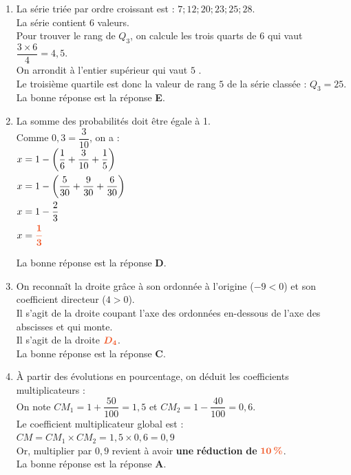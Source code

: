 \documentclass[a4paper,11pt]{article}
\begin{document}
\newpage
\begin{seance}{} %

\begin{enumerate}
\item La série triée par ordre croissant est : $7  ;  12  ;  20  ;  23  ;  25  ;  28$.\\La série contient $6$ valeurs.\\
      Pour trouver le rang de $Q_3$, on calcule les trois quarts de $6$ qui vaut
       $\dfrac{3\times6}{4}=4{,}5$.\\On arrondit à l'entier supérieur qui vaut $5$ .\\ Le troisième quartile est donc la valeur de rang $5$ de la série classée : $Q_3=25$.\\La bonne réponse est la réponse {\bfseries \color[HTML]{F15929}E}.

\item La somme des probabilités doit être égale à 1.  \\Comme $0{,}3=\dfrac{3}{10}$, on a : \\
        $\begin{aligned}
        x&=1-\left(\dfrac{1}{6}+\dfrac{3}{10}+\dfrac{1}{5}\right)\\
        x&=1-\left(\dfrac{5}{30}+\dfrac{9}{30}+\dfrac{6}{30}\right)\\
        x&=1-\dfrac{2}{3}\\
        x&={\color[HTML]{F15929}\boldsymbol{\dfrac{1}{3}}}
        \end{aligned}$ 

\medskip
La bonne réponse est la réponse {\bfseries \color[HTML]{F15929}D}.

\item On reconnaît la droite grâce à son ordonnée à l'origine ($-9<0$) et son coefficient directeur ($4>0$).\\
    Il s'agit de la droite coupant l'axe des ordonnées en-dessous de l'axe des abscisses et qui monte.\\
    Il s'agit de la droite ${\color[HTML]{F15929}\boldsymbol{D_4}}$.\\La bonne réponse est la réponse {\bfseries \color[HTML]{F15929}C}.

\item À partir des évolutions en pourcentage, on déduit les coefficients multiplicateurs : \\On note $CM_1 = 1 + \dfrac{50}{100}=1{,}5$ et  $CM_2 = 1 - \dfrac{40}{100}=0{,}6$.\\ Le coefficient multiplicateur global est : \\ $CM = CM_1 \times CM_2 = 1{,}5 \times 0{,}6 = 0{,}9$ \\Or, multiplier par $0{,}9$ revient à avoir {\bfseries \color[HTML]{F15929}une} {\bfseries \color[HTML]{F15929}réduction} {\bfseries \color[HTML]{F15929}de} ${\color[HTML]{F15929}\boldsymbol{10\,\%}}$.\\La bonne réponse est la réponse {\bfseries \color[HTML]{F15929}A}.


\end{enumerate}
\end{seance}
\end{document}
